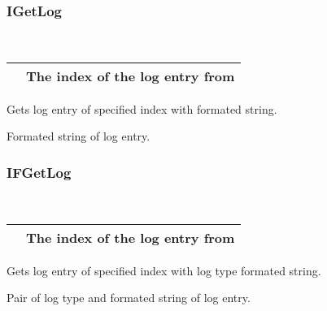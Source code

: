 \documentclass[letterpaper,10pt,english]{sphinxmanual}
\begin{document}
\subsubsection{IGetLog}
\label{\detokenize{log:igetlog}}

\begin{fulllineitems}
\label{\detokenize{log:_CPPv2N6pessum7IGetLogEi}}%
\pysigstartmultiline
{}%
\pysigstopmultiline~

\begin{savenotes}\sphinxattablestart
\centering
\begin{tabulary}{\linewidth}[t]{|T|T|}
\hline

&
The index of the log entry from {\hyperref[\detokenize{log:_CPPv2N6pessum11global_logsE}]{}}
\\
\hline
\end{tabulary}
\par
\sphinxattableend\end{savenotes}

Gets log entry of specified index with formated string.

 Formated string of log entry.

\end{fulllineitems}



\subsubsection{IFGetLog}
\label{\detokenize{log:ifgetlog}}

\begin{fulllineitems}
\label{\detokenize{log:_CPPv2N6pessum8IFGetLogEi}}%
\pysigstartmultiline
{}%
\pysigstopmultiline~

\begin{savenotes}\sphinxattablestart
\centering
\begin{tabulary}{\linewidth}[t]{|T|T|}
\hline

&
The index of the log entry from {\hyperref[\detokenize{log:_CPPv2N6pessum11global_logsE}]{}}
\\
\hline
\end{tabulary}
\par
\sphinxattableend\end{savenotes}

Gets log entry of specified index with log type formated string.

 Pair of log type and formated string of log entry.

\end{fulllineitems}
\end{document}
